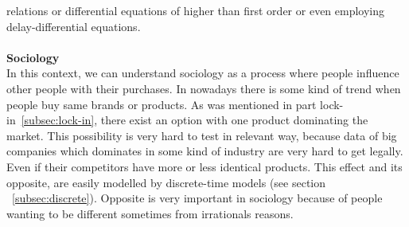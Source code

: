 relations or differential equations of higher than first order or even employing delay-differential equations.\\
\\
\textbf{Sociology} \label{subsec:sociology}\\
In this context, we can understand sociology as a process where people influence other people with their purchases.
In nowadays there is some kind of trend when people buy same brands or products.
As was mentioned in part lock-in~\ref{subsec:lock-in},
there exist an option with one product dominating the market.
This possibility is very hard to test in relevant way, because data of big  companies which dominates in some kind of industry are very hard to get legally.
Even if their competitors have more or less identical products.
This effect and its opposite, are easily modelled by discrete-time models (see section ~\ref{subsec:discrete}).
Opposite is very important in sociology because of people wanting to be different sometimes from irrationals reasons.

